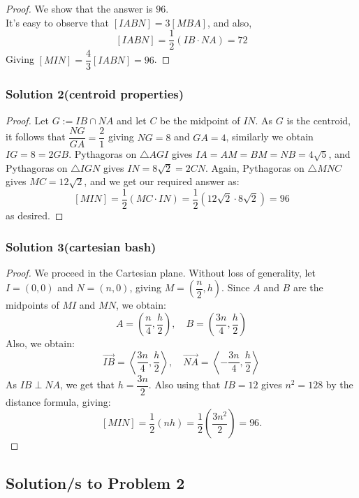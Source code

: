 \documentclass[11pt]{scrartcl}
\begin{document}
\begin{proof}
    We show that the answer is $96$. \\
    It's easy to observe that $[IABN] = 3[MBA]$, and also,
    \[
    [IABN] = \frac 12 (IB \cdot NA) = 72
    \]
    Giving $[MIN] = \dfrac 43 [IABN] = 96$.
\end{proof}

\subsubsection{Solution 2(centroid properties)}

\begin{proof}
    Let $G := IB \cap NA$ and let $C$ be the midpoint of $IN$.
    As $G$ is the centroid, it follows that
    $\dfrac{NG}{GA} = \dfrac 21$ giving $NG = 8$ and $GA = 4$,
    similarly we obtain $IG = 8 = 2GB$. Pythagoras on $\triangle AGI$
    gives $IA = AM = BM = NB = 4\sqrt5$, and Pythagoras on $\triangle IGN$
    gives $IN = 8\sqrt2 = 2CN$. Again, Pythagoras on $\triangle MNC$ gives 
    $MC = 12\sqrt2$, and we get our required answer as:
    \[
    [MIN] = \frac12 (MC \cdot IN) = \frac 12 (12\sqrt2 \cdot 8\sqrt2) = 96
    \]
    as desired.
\end{proof}

\subsubsection{Solution 3(cartesian bash)}

\begin{proof}
    We proceed in the Cartesian plane. Without loss of generality,
    let $I = (0,0)$ and $N = (n,0)$, giving $M = \left( \dfrac n2, h\right)$.
    Since $A$ and $B$ are the midpoints of $MI$ and $MN$, we obtain:
    \[
    A = \left( \frac n4, \frac h2 \right),
    \quad B = \left( \frac{3n}{4}, \frac h2 \right)
    \]
    Also, we obtain:
    \[
    \overrightarrow{IB} = \left\langle \frac{3n}{4}, \frac h2 \right\rangle,
    \quad \overrightarrow{NA} = \left\langle -\frac{3n}{4}, \frac h2 \right\rangle
    \]
    As $IB \perp NA$, we get that $h = \dfrac{3n}{2}$. Also using that $IB = 12$
    gives $n^2 = 128$ by the distance formula, giving:
    \[
    [MIN] = \frac 12 (nh) = \frac 12 \left( \frac{3n^2}{2} \right) = \boxed{96}.
    \]
\end{proof}

\newpage

\subsection{Solution/s to Problem 2}
\end{document}
